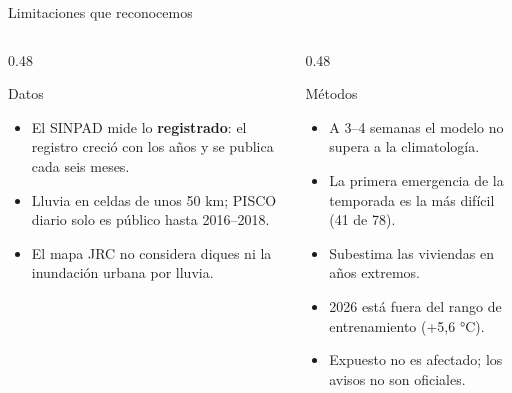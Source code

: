 \documentclass[aspectratio=169,11pt]{beamer}
\begin{document}
\begin{frame}{Limitaciones que reconocemos}
\begin{columns}[T]
\begin{column}{0.48\textwidth}
\begin{caja}{Datos}
\begin{itemize}\footnotesize
\item El SINPAD mide lo \textbf{registrado}: el registro creció con los años y se publica cada seis meses.
\item Lluvia en celdas de unos 50 km; PISCO diario solo es público hasta 2016–2018.
\item El mapa JRC no considera diques ni la inundación urbana por lluvia.
\end{itemize}
\end{caja}
\end{column}
\begin{column}{0.48\textwidth}
\begin{caja}[naranja]{Métodos}
\begin{itemize}\footnotesize
\item A 3–4 semanas el modelo no supera a la climatología.
\item La primera emergencia de la temporada es la más difícil (41 de 78).
\item Subestima las viviendas en años extremos.
\item 2026 está fuera del rango de entrenamiento (+5,6 °C).
\item Expuesto no es afectado; los avisos no son oficiales.
\end{itemize}
\end{caja}
\end{column}
\end{columns}
\end{frame}
\end{document}
